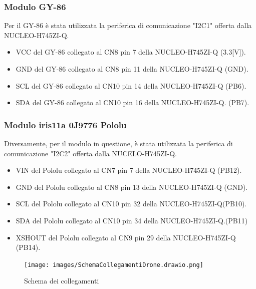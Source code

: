 \documentclass[11pt]{report}
\begin{document}
\subsubsection{Modulo GY-86}
Per il GY-86 è stata utilizzata la periferica di comunicazione "I2C1" offerta dalla NUCLEO-H745ZI-Q.
\begin{itemize}
\item VCC del GY-86 collegato al CN8 pin 7   della NUCLEO-H745ZI-Q (3.3[V]).
\item GND del GY-86 collegato al CN8 pin 11  della NUCLEO-H745ZI-Q (GND).
\item SCL del GY-86 collegato al CN10 pin 14 della NUCLEO-H745ZI-Q (PB6).
\item SDA del GY-86 collegato al CN10 pin 16 della NUCLEO-H745ZI-Q. (PB7).
\end{itemize}
\subsubsection{Modulo iris11a 0J9776 Pololu}
Diversamente, per il modulo in questione, è stata utilizzata la periferica di comunicazione "I2C2" offerta dalla NUCELO-H745ZI-Q.
\begin{itemize}
\item VIN del Pololu collegato al CN7 pin 7   della NUCLEO-H745ZI-Q (PB12).
\item GND del Pololu collegato al CN8 pin 13  della NUCLEO-H745ZI-Q (GND).
\item SCL del Pololu collegato al CN10 pin 32 della NUCLEO-H745ZI-Q(PB10).
\item SDA del Pololu collegato al CN10 pin 34 della NUCLEO-H745ZI-Q.(PB11)
\item XSHOUT del Pololu collegato al CN9 pin 29 della NUCLEO-H745ZI-Q (PB14).
\end{itemize}

\begin{figure}[H]
    \centering
    \texttt{[image: images/SchemaCollegamentiDrone.drawio.png]}
    \caption{Schema dei collegamenti}
    \label{fig:schema}
    \end{figure}

\end{document}

